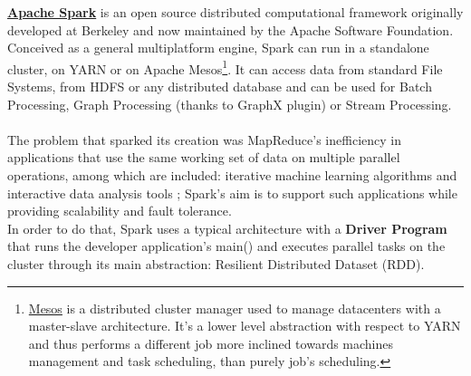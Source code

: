 \href{https://spark.apache.org/}{\textbf{Apache Spark}} \cite{spark_doc} is an open source distributed computational framework originally developed at Berkeley and now maintained by the Apache Software Foundation.
\\
Conceived as a general multiplatform engine, Spark can run in a standalone cluster, on YARN or on Apache Mesos\footnote{\href{https://mesos.apache.org/}{Mesos} is a distributed cluster manager used to manage datacenters with a master-slave architecture. It's a lower level abstraction with respect to YARN and thus performs a different job more inclined towards machines management and task scheduling, than purely job's scheduling.}. It can access data from standard File Systems, from HDFS or any distributed database and can be used for Batch Processing, Graph Processing (thanks to GraphX plugin) or Stream Processing.
\\
\\
The problem that sparked its creation was MapReduce's inefficiency in applications that use the same working set of data on multiple parallel operations, among which are included: iterative machine learning algorithms and interactive data analysis tools \cite{Zaharia:2010:SCC:1863103.1863113}; Spark's aim is to support such applications while providing scalability and fault tolerance.
\\
In order to do that, Spark uses a typical architecture with a \textbf{Driver Program} that runs the developer application's main() and executes parallel tasks on the cluster through its main abstraction: Resilient Distributed Dataset (RDD).

